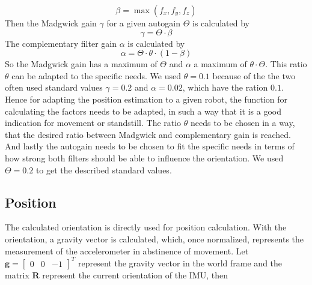 \documentclass[letterpaper, 10 pt, conference]{ieeeconf}  %
\newcommand{\M}[1]{\mathbf{#1}} %
\newcommand{\V}[1]{\mathbf{#1}} %
\begin{document}
\begin{equation}
\beta = \max(f_x,f_y,f_z)\label{eq:weight_autogain}
\end{equation}
Then the Madgwick gain $\gamma$ for a given autogain $\Theta$ is calculated by 
\begin{equation}
\gamma = \Theta \cdot \beta
\end{equation}
The complementary filter gain $\alpha$ is calculated by
\begin{equation}
\alpha= \Theta \cdot \theta \cdot(1-\beta)
\end{equation}
So the Madgwick gain has a maximum of $\Theta$ and $\alpha$ a maximum of $\theta\cdot \Theta$. This ratio $\theta$ can be adapted to the specific needs.
We used $\theta = 0.1$ because of the the two often used standard values $\gamma = 0.2$ and $\alpha= 0.02$, which have the ration $0.1$.
Hence for adapting the position estimation to a given robot, the function for calculating the factors needs to be adapted, in such a way that it is a good indication for movement or standstill.
The ratio $\theta$ needs to be chosen in a way, that the desired ratio between Madgwick and complementary gain is reached.
And lastly the autogain needs to be chosen to fit the specific needs in terms of how strong both filters should be able to influence the orientation.
We used $\Theta = 0.2$ to get the described standard values.


\subsection{Position}
The calculated orientation is directly used for position calculation.
With the orientation, a gravity vector is calculated, which, once normalized, represents the  measurement of the accelerometer in abstinence of movement. 
Let $\V g=\begin{bmatrix}0 &0 & -1 \end{bmatrix}^T$ represent the gravity vector in the world frame and the matrix $\M R$ represent the current orientation of the IMU, then
\end{document}
